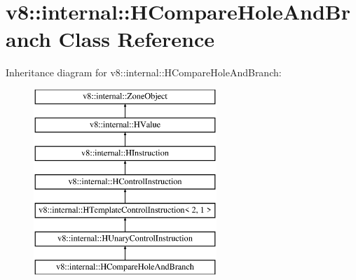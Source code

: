 \hypertarget{classv8_1_1internal_1_1_h_compare_hole_and_branch}{}\section{v8\+:\+:internal\+:\+:H\+Compare\+Hole\+And\+Branch Class Reference}
\label{classv8_1_1internal_1_1_h_compare_hole_and_branch}
Inheritance diagram for v8\+:\+:internal\+:\+:H\+Compare\+Hole\+And\+Branch\+:\begin{figure}[H]
\begin{center}
\leavevmode
\includegraphics[height=7.000000cm]{classv8_1_1internal_1_1_h_compare_hole_and_branch}
\end{center}
\end{figure}
